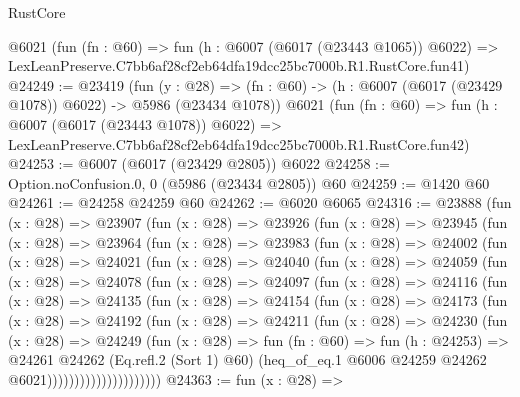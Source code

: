\begin{lexlean}{RustCore}
\begin{coremodule}
    @6021
    (fun (fn : @60) =>
    fun (h : @6007 (@6017 (@23443 @1065)) @6022) =>
    LexLeanPreserve.C7bb6af28cf2eb64dfa19dcc25bc7000b.R1.RustCore.fun41)
@24249 := @23419
    (fun (y : @28) =>
    (fn : @60) -> (h : @6007 (@6017 (@23429 @1078)) @6022) -> @5986 (@23434 @1078))
    @6021
    (fun (fn : @60) =>
    fun (h : @6007 (@6017 (@23443 @1078)) @6022) =>
    LexLeanPreserve.C7bb6af28cf2eb64dfa19dcc25bc7000b.R1.RustCore.fun42)
@24253 := @6007 (@6017 (@23429 @2805)) @6022
@24258 := Option.noConfusion.{0, 0} (@5986 (@23434 @2805)) @60
@24259 := @1420 @60
@24261 := @24258 @24259 @60
@24262 := @6020 @6065
@24316 := @23888
    (fun (x : @28) =>
    @23907
      (fun (x : @28) =>
      @23926
        (fun (x : @28) =>
        @23945
          (fun (x : @28) =>
          @23964
            (fun (x : @28) =>
            @23983
              (fun (x : @28) =>
              @24002
                (fun (x : @28) =>
                @24021
                  (fun (x : @28) =>
                  @24040
                    (fun (x : @28) =>
                    @24059
                      (fun (x : @28) =>
                      @24078
                        (fun (x : @28) =>
                        @24097
                          (fun (x : @28) =>
                          @24116
                            (fun (x : @28) =>
                            @24135
                              (fun (x : @28) =>
                              @24154
                                (fun (x : @28) =>
                                @24173
                                  (fun (x : @28) =>
                                  @24192
                                    (fun (x : @28) =>
                                    @24211
                                      (fun (x : @28) =>
                                      @24230
                                        (fun (x : @28) =>
                                        @24249
                                          (fun (x : @28) =>
                                          fun (fn : @60) =>
                                          fun (h : @24253) =>
                                          @24261
                                            @24262
                                            (Eq.refl.{2} (Sort 1) @60)
                                            (heq_of_eq.{1}
                                              @6006
                                              @24259
                                              @24262
                                              @6021)))))))))))))))))))))
@24363 := fun (x : @28) =>

\end{coremodule}
\end{lexlean}
